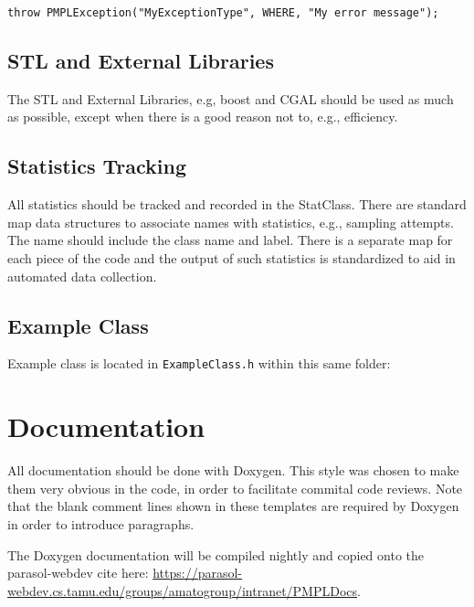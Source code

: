 \documentclass[12pt]{article}
\begin{document}
\begin{lstlisting}
throw PMPLException("MyExceptionType", WHERE, "My error message");
\end{lstlisting}

\subsection{STL and External Libraries}

The STL and External Libraries, e.g, boost and CGAL should be used as much as
possible, except when there is a good reason not to, e.g., efficiency.

\subsection{Statistics Tracking}

All statistics should be tracked and recorded in the StatClass. There are
standard map data structures to associate names with statistics, e.g., sampling
attempts. The name should include the class name and label. There is a separate
map for each piece of the code and the output of such statistics is standardized
to aid in automated data collection.

\subsection{Example Class}
Example class is located in \texttt{ExampleClass.h} within this same folder:




\section{Documentation}
All documentation should be done with Doxygen. This style was chosen to make
them very obvious in the code, in order to facilitate commital code reviews.
Note that the blank comment lines shown in these templates are required by
Doxygen in order to introduce paragraphs.

The Doxygen documentation will be compiled nightly and copied onto the
parasol-webdev cite here:
\url{https://parasol-webdev.cs.tamu.edu/groups/amatogroup/intranet/PMPLDocs}.
\end{document}
